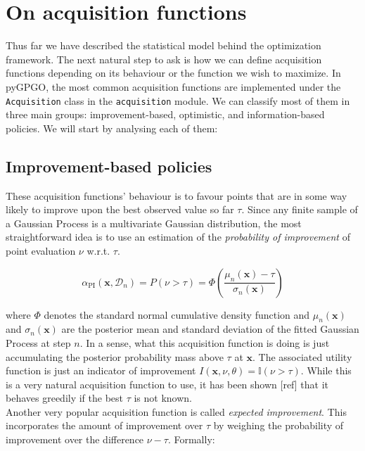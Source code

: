\documentclass[10pt,a4paper,twoside]{book}
\begin{document}
\section{On acquisition functions}

Thus far we have described the statistical model behind the optimization framework. The next natural step to ask is how we can define acquisition functions depending on its behaviour or the function we wish to maximize. In pyGPGO, the most common acquisition functions are implemented under the \texttt{Acquisition} class in the \texttt{acquisition} module. We can classify most of them in three main groups: improvement-based, optimistic, and information-based policies. We will start by analysing each of them:

\subsection{Improvement-based policies}

These acquisition functions' behaviour is to favour points that are in some way likely to improve upon the best observed value so far $\tau$. Since any finite sample of a Gaussian Process is a multivariate Gaussian distribution, the most straightforward idea is to use an estimation of the \textit{probability of improvement} of point evaluation $\nu$ w.r.t. $\tau$.

\begin{equation}
\alpha_{\mathrm{PI}}(\boldsymbol{x}, \mathcal{D}_n) = P\left(\nu > \tau\right) = \Phi\left(\dfrac{\mu_n(\boldsymbol{x}) - \tau}{\sigma_n(\boldsymbol{x})}  \right)
\end{equation}

where $\Phi$ denotes the standard normal cumulative density function and $\mu_n(\boldsymbol{x})$ and $\sigma_n(\boldsymbol{x})$ are the posterior mean and standard deviation of the fitted Gaussian Process at step $n$. In a sense, what this acquisition function is doing is just accumulating the posterior probability mass above $\tau$ at $\boldsymbol{x}$. The associated utility function is just an indicator of improvement $I(\boldsymbol{x},\nu, \theta) = \mathbb{I}(\nu > \tau)$. While this is a very natural acquisition function to use, it has been shown [ref] that it behaves greedily if the best $\tau$ is not known. \\

Another very popular acquisition function is called \textit{expected improvement}. This incorporates the amount of improvement over $\tau$ by weighing the probability of improvement over the difference $\nu - \tau$. Formally:
\end{document}
